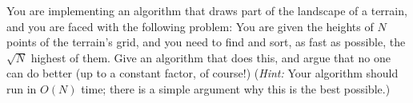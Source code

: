 You are implementing an algorithm that draws part of the landscape of a
terrain, and you are faced with the following problem: You are given
the heights of $N$  points of the terrain's grid, and you need to find
and sort, as fast as possible, the $\sqrt  N$ highest of them. Give an
algorithm that does this, and argue that no one can do better (up to a
constant factor, of course!) ({\em Hint:} Your algorithm should run in
$O(N)$ time; there is a simple argument why this is the best
possible.)


